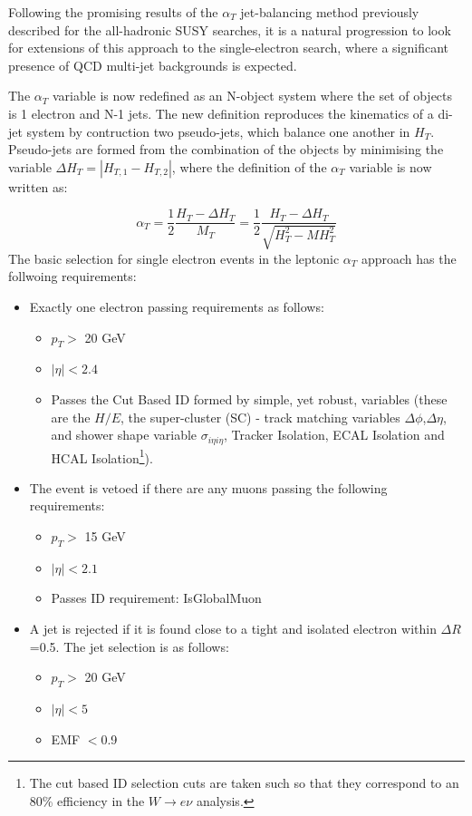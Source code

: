 \documentclass{article}
\begin{document}
Following the promising results of the $\alpha_{T}$ jet-balancing method previously described for the all-hadronic SUSY searches, it is a natural progression to look for extensions of this approach to the single-electron search, where a significant presence of QCD multi-jet backgrounds is expected.

The $\alpha_{T}$ variable is now redefined as an N-object system where the set of objects is 1 electron and N-1 jets. The new definition reproduces the kinematics of a di-jet system by contruction two pseudo-jets, which balance one another in $H_{T}$. Pseudo-jets are formed from the combination of the objects by minimising the variable $\Delta H_{T} = |H_{T,1} - H_{T,2}|$, where the definition of the $\alpha_{T}$ variable is now written as:

\begin{equation}
\alpha_{T} = \frac{1}{2} \frac{H_{T} - \Delta H_{T}}{M_{T}} =  \frac{1}{2} \frac{H_{T} - \Delta H_{T}}{\sqrt{H_{T}^{2}-MH_{T}^{2}}}
\end{equation}
The basic selection for single electron events in the leptonic $\alpha_{T}$ approach has the follwoing requirements:
\begin{itemize}


\item Exactly one electron passing requirements as follows:
\begin{itemize}
\item $p_{T} >$ 20 GeV
\item $|\eta| <2.4$
\item Passes the Cut Based ID formed by simple, yet robust, variables (these are the $H/E$, the super-cluster (SC) - track matching variables $\Delta \phi$,$\Delta \eta$, and shower shape variable $\sigma_{i\eta i\eta}$, Tracker Isolation, ECAL Isolation and HCAL Isolation\footnote{The cut based ID selection cuts are taken such so that they correspond to an 80\% efficiency in the $W\rightarrow e\nu$ analysis.}). 
\end{itemize}
\item The event is vetoed if there are any muons passing the following requirements:
\begin{itemize}
\item $p_{T} >$ 15 GeV
\item $|\eta| <2.1$
\item Passes ID requirement: IsGlobalMuon
\end{itemize}
\item A jet is rejected if it is found close to a tight and isolated electron within $\Delta R$=0.5.
 The jet selection is as follows:
\begin{itemize}
\item $p_{T} >$ 20 GeV
\item $|\eta| <5$
\item EMF $<$0.9
\end{itemize}

\end{itemize}
\end{document}
